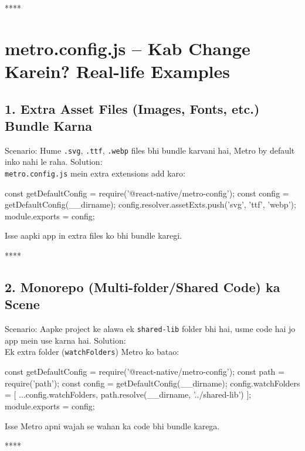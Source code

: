 \documentclass[a4paper]{article}
\newcommand\imp[1]{{\color{ImportantRed}#1}}
\begin{document}
****
\section*{metro.config.js – Kab Change Karein? Real-life Examples}

\subsection*{1. Extra Asset Files (Images, Fonts, etc.) Bundle Karna}
\imp{Scenario:} Hume \texttt{.svg}, \texttt{.ttf}, \texttt{.webp} files bhi bundle karvani hai, Metro by default inko nahi le raha.
\imp{Solution:}\\
\texttt{metro.config.js} mein extra extensions add karo:

\begin{codeblock}
const { getDefaultConfig } = require('@react-native/metro-config');
const config = getDefaultConfig(__dirname);
config.resolver.assetExts.push('svg', 'ttf', 'webp');
module.exports = config;
\end{codeblock}

Isse aapki app in extra files ko bhi bundle karegi.

****
\subsection*{2. Monorepo (Multi-folder/Shared Code) ka Scene}
\imp{Scenario:} Aapke project ke alawa ek \texttt{shared-lib} folder bhi hai, usme code hai jo app mein use karna hai.
\imp{Solution:}\\
Ek extra folder (\texttt{watchFolders}) Metro ko batao:

\begin{codeblock}
const { getDefaultConfig } = require('@react-native/metro-config');
const path = require('path');
const config = getDefaultConfig(__dirname);
config.watchFolders = [
  ...config.watchFolders,
  path.resolve(__dirname, '../shared-lib')
];
module.exports = config;
\end{codeblock}

Isse Metro apni wajah se wahan ka code bhi bundle karega.

****
\end{document}
